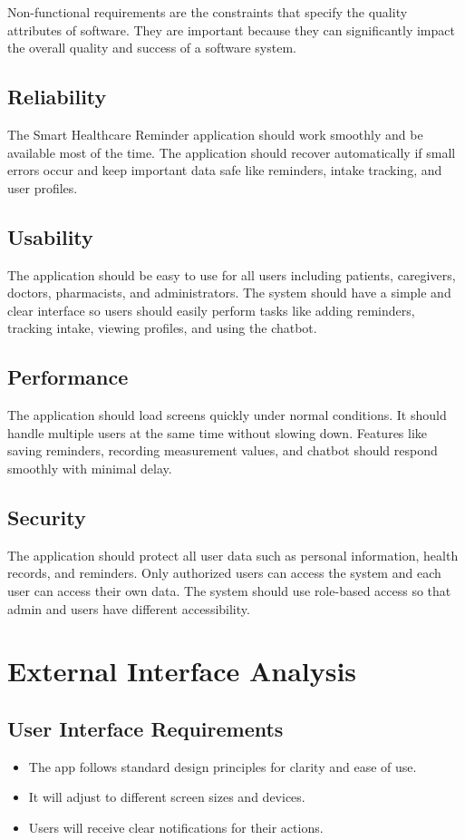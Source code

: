 \documentclass[12pt, a4paper, oneside]{report}
\begin{document}
Non-functional requirements are the constraints that specify the quality attributes of software. They are important because they can significantly impact the overall quality and success of a software system.

\subsection{Reliability}
The Smart Healthcare Reminder application should work smoothly and be available most of the time. The application should recover automatically if small errors occur and keep important data safe like reminders, intake tracking, and user profiles.

\subsection{Usability}
The application should be easy to use for all users including patients, caregivers, doctors, pharmacists, and administrators. The system should have a simple and clear interface so users should easily perform tasks like adding reminders, tracking intake, viewing profiles, and using the chatbot.

\subsection{Performance}
The application should load screens quickly under normal conditions. It should handle multiple users at the same time without slowing down. Features like saving reminders, recording measurement values, and chatbot should respond smoothly with minimal delay.

\subsection{Security}
The application should protect all user data such as personal information, health records, and reminders. Only authorized users can access the system and each user can access their own data. The system should use role-based access so that admin and users have different accessibility.

\section{External Interface Analysis}
\label{sec:external-interface}

\subsection{User Interface Requirements}
\begin{itemize}
    \item The app follows standard design principles for clarity and ease of use.
    \item It will adjust to different screen sizes and devices.
    \item Users will receive clear notifications for their actions.
\end{itemize}
\end{document}
